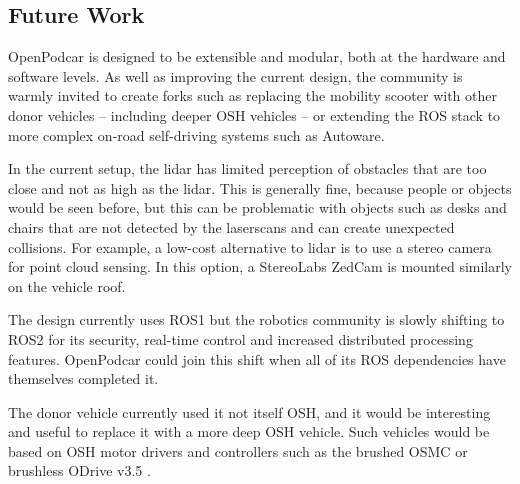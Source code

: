 \documentclass[a4paper]{article}
\begin{document}
	\subsection{Future Work}\label{h.neocsr410zj}
	
	OpenPodcar is designed to be extensible and modular, both at the hardware and software levels.  As well as improving the current design, the community is warmly invited to create forks such as replacing the mobility scooter with other donor vehicles -- including deeper OSH vehicles -- or extending the ROS stack to more complex on-road self-driving systems such as Autoware.
	
	In the current setup, the lidar has limited perception of obstacles that are too close and not as high as the lidar. This is generally fine, because people or objects would be seen before, but this can be problematic with objects such as desks and chairs that are not detected by the laserscans and can create unexpected collisions. For example, a low-cost alternative to lidar is to use a stereo camera for point cloud sensing. In this option, a StereoLabs ZedCam is mounted similarly on the vehicle roof. 
	
	The design currently uses ROS1 but the robotics community is slowly shifting to ROS2 for its security, real-time control and increased distributed processing features.  OpenPodcar could join this shift when all of its ROS dependencies have themselves completed it.
	
	The donor vehicle currently used it not itself OSH, and it would be interesting and useful to replace it with a more deep OSH vehicle.   Such vehicles would be based on OSH motor drivers and controllers such as the brushed OSMC \cite{robotpoweropen} or brushless ODrive v3.5  \cite{oriveroboticsodrive}.
	
	
	
	
	
\end{document}
